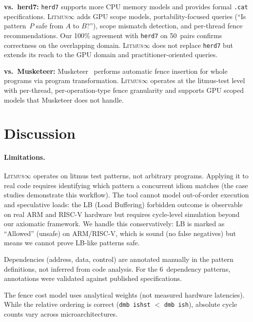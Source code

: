 \documentclass[10pt]{article}
\newcommand{\litmus}{\textsc{Litmus$\infty$}}
\begin{document}
\textbf{vs.\ herd7:} \texttt{herd7} supports more CPU memory models
and provides formal \texttt{.cat} specifications. \litmus{} adds GPU
scope models, portability-focused queries (``Is pattern~$P$ safe from
$A$ to $B$?''), scope mismatch detection, and per-thread fence
recommendations. Our 100\% agreement with \texttt{herd7} on 50~pairs
confirms correctness on the overlapping domain. \litmus{} does not
replace \texttt{herd7} but extends its reach to the GPU domain and
practitioner-oriented queries.

\textbf{vs.\ Musketeer:} Musketeer~\cite{Alglave2014Musketeer}
performs automatic fence insertion for whole programs via program
transformation. \litmus{} operates at the litmus-test level with
per-thread, per-operation-type fence granularity and supports GPU
scoped models that Musketeer does not handle.

\section{Discussion}
\label{sec:discussion}

\paragraph{Limitations.}
\litmus{} operates on litmus test patterns, not arbitrary programs.
Applying it to real code requires identifying which pattern a
concurrent idiom matches (the case studies demonstrate this
workflow). The tool cannot model out-of-order execution and
speculative loads: the LB (Load Buffering) forbidden outcome is
observable on real ARM and RISC-V hardware but requires cycle-level
simulation beyond our axiomatic framework. We handle this conservatively:
LB is marked as ``Allowed'' (unsafe) on ARM/RISC-V, which is sound
(no false negatives) but means we cannot prove LB-like patterns safe.

Dependencies (address, data, control) are annotated manually in the
pattern definitions, not inferred from code analysis. For the 6~dependency
patterns, annotations were validated against published specifications.

The fence cost model uses analytical weights (not measured hardware
latencies). While the relative ordering is correct (\texttt{dmb~ishst}
$<$ \texttt{dmb~ish}), absolute cycle counts vary across
microarchitectures.
\end{document}
